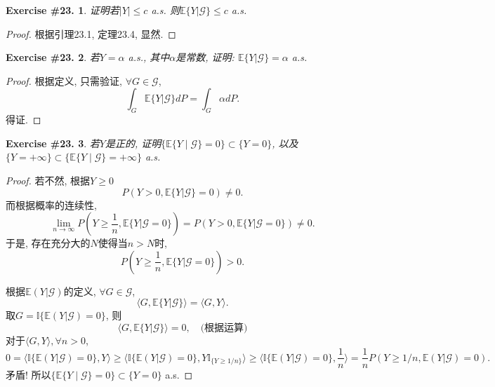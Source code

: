 \documentclass[UTF8, a4paper]{article}
\newtheorem{exercise}{Exercise \#23.}
\begin{document}
\begin{framed}
\begin{exercise}
证明若\(|Y| \leq c\) a.s. 则\(\mathbb{E}\{Y|\mathcal{G}\} \leq c\) a.s.
\end{exercise}
\end{framed}


\begin{proof}
根据引理23.1, 定理23.4, 显然.
\end{proof}


\begin{framed}
\begin{exercise}
若\(Y = \alpha\) a.s., 其中\(\alpha\)是常数, 证明: \(\mathbb{E}\{Y|\mathcal{G}\} = \alpha\) a.s.
\end{exercise}
\end{framed}

\begin{proof}
根据定义, 只需验证, \(\forall G \in \mathcal{G}\), 
$$
\int_G \mathbb{E}\{Y|\mathcal{G}\} dP = \int_G \alpha dP.
$$
得证.
\end{proof}


\begin{framed}
\begin{exercise}
若\(Y\)是正的, 证明\(\{\mathbb{E}\{Y \mid \mathcal{G}\} = 0\} \subset \{Y = 0\}\), 以及\(\{Y = +\infty\} \subset \{\mathbb{E}\{Y\mid \mathcal{G}\} = + \infty\}\) a.s.
\end{exercise}
\end{framed}

\begin{proof}
若不然, 根据\(Y \geq 0\)
$$
P(Y >0, \mathbb{E}\{Y|\mathcal{G}\} = 0) \neq 0.
$$
而根据概率的连续性, 
$$
\lim_{n\to \infty} P\left(Y \geq \frac{1}{n}, \mathbb{E}\{Y|\mathcal{G} = 0\}\right) = P( Y > 0, \mathbb{E}\{Y|\mathcal{G} = 0\}) \neq 0.
$$
于是, 存在充分大的\(N\)使得当\(n > N\)时, 
$$
P\left(Y \geq \frac{1}{n}, \mathbb{E}\{Y|\mathcal{G} = 0\}\right) > 0.
$$


根据\(\mathbb{E}(Y | \mathcal{G})\)的定义, \(\forall G \in\mathcal{G}\), 
$$
\langle G, \mathbb{E}\{Y|\mathcal{G}\}\rangle = \langle G, Y\rangle.
$$
取\(G = \mathbb{I}\{\mathbb{E}(Y|\mathcal{G}) = 0\}\), 则
$$
\langle G, \mathbb{E}\{Y|\mathcal{G}\}\rangle = 0, \quad \text{(根据运算)}
$$
对于\(\langle G, Y \rangle, \forall n > 0\), 
$$
0 = \langle \mathbb{I}\{\mathbb{E}(Y|\mathcal{G}) = 0\}, Y \rangle \geq \langle \mathbb{I}\{\mathbb{E}(Y|\mathcal{G}) = 0\}, Y \mathbb{I}_{\{Y \geq 1/n\}} \rangle \geq \langle \mathbb{I}\{\mathbb{E}(Y|\mathcal{G}) = 0\}, \frac{1}{n}  \rangle = \frac{1}{n} P(Y \geq 1/n, \mathbb{E}(Y|\mathcal{G}) = 0).
$$
矛盾! 所以\(\{\mathbb{E}\{Y \mid \mathcal{G}\} = 0\} \subset \{Y = 0\}\) a.s.

\end{proof}
\end{document}
